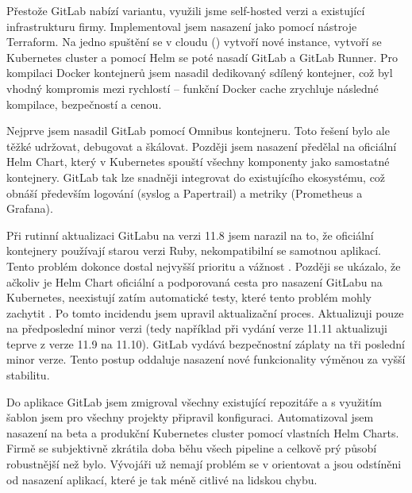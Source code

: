     Přestože GitLab nabízí  variantu, využili jsme self-hosted verzi a existující infrastrukturu firmy. Implementoval jsem nasazení jako  pomocí nástroje Terraform. Na jedno spuštění se v cloudu () vytvoří nové instance, vytvoří se Kubernetes cluster a pomocí Helm se poté nasadí GitLab a GitLab Runner. Pro kompilaci Docker kontejnerů jsem nasadil dedikovaný sdílený  kontejner, což byl vhodný kompromis mezi rychlostí -- funkční Docker cache zrychluje následné kompilace, bezpečností a cenou.

    Nejprve jsem nasadil GitLab pomocí Omnibus kontejneru. Toto řešení bylo ale těžké udržovat, debugovat a škálovat. Později jsem nasazení předělal na oficiální Helm Chart, který v Kubernetes spouští všechny komponenty jako samostatné kontejnery. GitLab tak lze snadněji integrovat do existujícího ekosystému, což obnáší především logování (syslog a Papertrail) a metriky (Prometheus a Grafana).

    Při rutinní aktualizaci GitLabu na verzi 11.8 jsem narazil na to, že oficiální kontejnery používají starou verzi Ruby, nekompatibilní se samotnou aplikací. Tento problém dokonce dostal nejvyšší prioritu a vážnost \cite{gitlab-issue-chart}. Později se ukázalo, že ačkoliv je Helm Chart oficiální a podporovaná cesta pro nasazení GitLabu na Kubernetes, neexistují zatím automatické testy, které tento problém mohly zachytit \cite{gitlab-issue-qa}. Po tomto incidendu jsem upravil aktualizační proces. Aktualizuji pouze na předposlední minor verzi (tedy například při vydání verze 11.11 aktualizuji teprve z verze 11.9 na 11.10). GitLab vydává bezpečnostní záplaty na tři poslední minor verze. Tento postup oddaluje nasazení nové funkcionality výměnou za vyšší stabilitu.

    Do aplikace GitLab jsem zmigroval všechny existující repozitáře a s využitím šablon jsem pro všechny projekty připravil \CI konfiguraci. Automatizoval jsem nasazení na beta a produkční Kubernetes cluster pomocí vlastních Helm Charts. Firmě se subjektivně zkrátila doba běhu všech pipeline a celkově prý působí \CI robustnější než bylo. Vývojáři už nemají problém se v \CI orientovat a jsou odstíněni od nasazení aplikací, které je tak méně citlivé na lidskou chybu.
